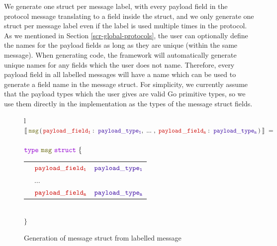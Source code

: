 \documentclass[12pt,twoside]{report}
\begin{document}
We generate one struct per message label, with every payload field in the protocol message translating to a field inside the struct, and we only generate one struct per message label even if the label is used multiple times in the protocol. As we mentioned in Section \ref{scr-global-protocols}, the user can optionally define the names for the payload fields as long as they are unique (within the same message). When generating code, the framework will automatically generate unique names for any fields which the user does not name. Therefore, every payload field in all labelled messages will have a name which can be used to generate a field name in the message struct. For simplicity, we currently assume that the payload types which the user gives are valid Go primitive types, so we use them directly in the implementation as the types of the message struct fields.

\begin{figure}[!h]
    \begin{center}
        \begin{tabular}{l}
            $\llbracket\;\structname{msg}\,(\,\payloaddecl{payload\,\_field}{payload\_type}{n}\,)\;\rrbracket\ = $\\\\
        
            $\gotype\ \structname{msg}\ \gostruct\ \{$\\[3pt]
            \begin{tabular}{lll}
                \indent & $\structfield{payload\_field_1}$ & $\typename{payload\_type_1}$\\
                \indent & $\dots$ &\\
                \indent & $\structfield{payload\_field_n}$ & $\typename{payload\_type_n}$
            \end{tabular}\\
        
            $\}$
        \end{tabular}
    \end{center}
    \caption{Generation of message struct from labelled message}
    \label{msg-struct-codegen}
\end{figure}
\end{document}
